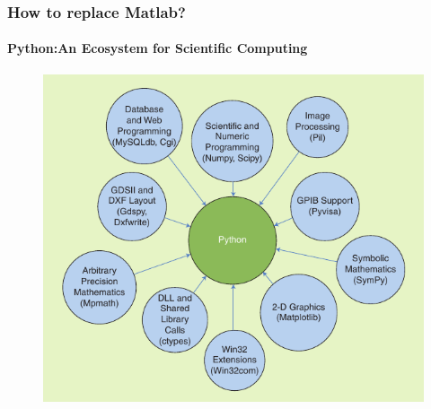 \documentclass[compress=true]{beamer}
\begin{document}
\begin{frame}
	\frametitle{How to replace Matlab?}
	\framesubtitle{Python:An Ecosystem for Scientific Computing}
	\begin{figure}
		\includegraphics[height=0.8\textheight]{python_1.png}
	\end{figure}
\end{frame}
\end{document}
